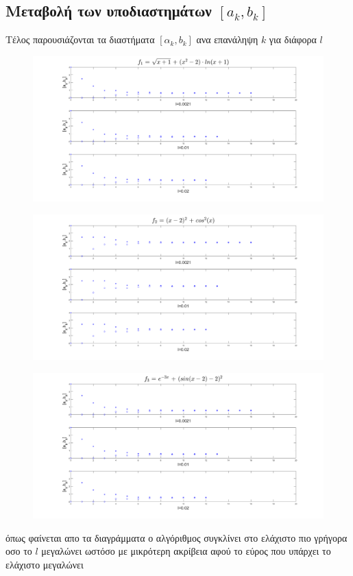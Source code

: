 \documentclass{article}
\begin{document}
 \subsection*{Μεταβολή των υποδιαστημάτων $[a_k,b_k]$}
Tέλος παρουσιάζονται τα διαστήματα $[α_k,b_k]$ ανα επανάληψη $k$ για διάφορα $l$  
\begin{figure}[h!]	
     \centering
     \advance\leftskip-2.45cm 
  \includegraphics[width=160mm,scale=2]{u2a.png}
\end{figure}
\begin{figure}[h!]	
     \centering
     \advance\leftskip-2.45cm 
  \includegraphics[width=160mm,scale=2]{u2b.png}
\end{figure} \clearpage
\begin{figure}[h!]	
     \centering
     \advance\leftskip-2.45cm 
  \includegraphics[width=170mm,scale=2]{u2c.png}
\end{figure}
 όπως φαίνεται απο τα διαγράμματα ο αλγόριθμος συγκλίνει στο ελάχιστο πιο γρήγορα οσο το $l$ μεγαλώνει ωστόσο με μικρότερη ακρίβεια αφού το εύρος που υπάρχει το ελάχιστο μεγαλώνει 
 \newpage
\end{document}
